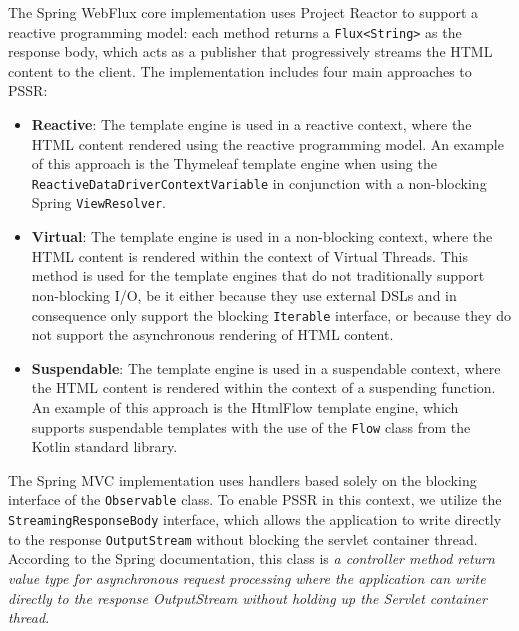 The Spring WebFlux core implementation uses Project Reactor to support a
reactive programming model: each method returns a \texttt{Flux<String>} as the
response body, which acts as a publisher that progressively streams the HTML
content to the client. The implementation includes four main approaches to
PSSR\@:
\begin{itemize}
  \item \textbf{Reactive}: The template engine is used in a reactive context,
        where the HTML content rendered using the reactive programming model.
        An example of this approach is the Thymeleaf template engine
        when using the \texttt{ReactiveDataDriverContextVariable} in conjunction with a
        non-blocking Spring \texttt{ViewResolver}.
  \item \textbf{Virtual}: The template engine is used in a non-blocking
        context, where the HTML content is rendered within the context of Virtual
        Threads. This method is used for the template engines that do not traditionally
        support non-blocking I/O, be it either because they use external DSLs and in
        consequence only support the blocking \texttt{Iterable} interface, or
        because they do not support the asynchronous rendering of HTML content.
  \item \textbf{Suspendable}: The template engine is used in a suspendable
        context, where the HTML content is rendered within the context of a suspending function.
        An example of this approach is the HtmlFlow template engine, which
        supports suspendable templates with the use of the \texttt{Flow} class from the
        Kotlin standard library.
\end{itemize}
The Spring MVC implementation uses handlers based solely on the blocking
interface of the \texttt{Observable} class. To enable PSSR in this context, we
utilize the \texttt{StreamingResponseBody} interface, which allows the
application to write directly to the response \texttt{OutputStream} without
blocking the servlet container thread. According to the Spring documentation,
this class is \textit{a controller method return value type for asynchronous
request processing where the application can write directly to the response
OutputStream without holding up the Servlet container thread.}

